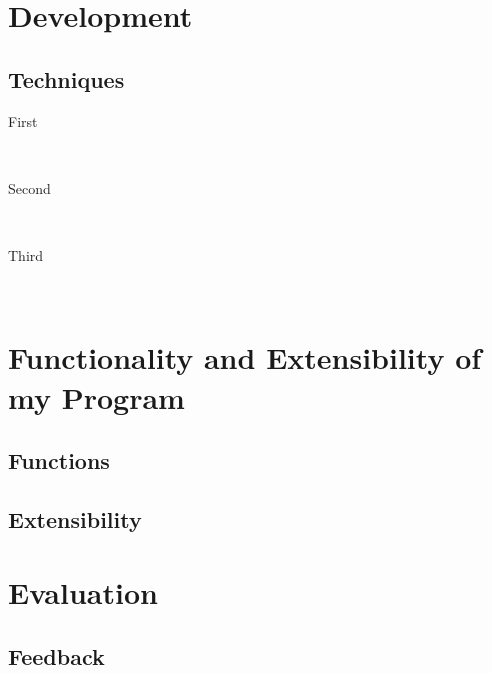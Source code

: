\documentclass[12pt]{article} %
\begin{document}
\section{Development} %

\subsection{Techniques} %

\begin{description} %

\item[First] \hfill \\


\item[Second] \hfill \\


\item[Third] \hfill \\


\end{description} 


\vfill

\section{Functionality and Extensibility of my Program}

\subsection{Functions} %

\subsection{Extensibility} %

\vfill

\section{Evaluation} 

\subsection{Feedback}
\end{document}
